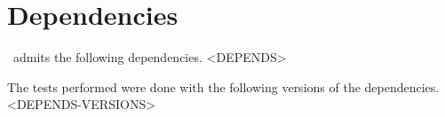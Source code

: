 \documentclass{tutodoc}
\begin{document}
\section{Dependencies}

\thisproj\ admits the following dependencies.
<DEPENDS>

\begin{tdocnote}
    The tests performed were done with the following versions of the dependencies.
    <DEPENDS-VERSIONS>
\end{tdocnote}
\end{document}
